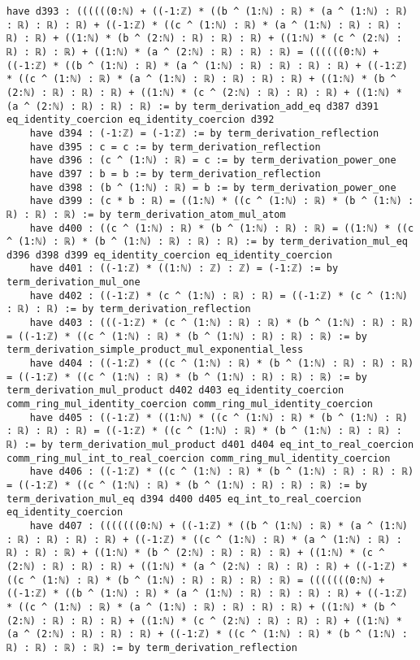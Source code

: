 \documentclass{article}
\begin{document}
\begin{tcolorbox}[colback=white!10, width=\linewidth]
\begin{lstlisting}[language=Lean4]
    have d393 : ((((((0:ℕ) + ((-1:ℤ) * ((b ^ (1:ℕ) : ℝ) * (a ^ (1:ℕ) : ℝ) : ℝ) : ℝ) : ℝ) + ((-1:ℤ) * ((c ^ (1:ℕ) : ℝ) * (a ^ (1:ℕ) : ℝ) : ℝ) : ℝ) : ℝ) + ((1:ℕ) * (b ^ (2:ℕ) : ℝ) : ℝ) : ℝ) + ((1:ℕ) * (c ^ (2:ℕ) : ℝ) : ℝ) : ℝ) + ((1:ℕ) * (a ^ (2:ℕ) : ℝ) : ℝ) : ℝ) = ((((((0:ℕ) + ((-1:ℤ) * ((b ^ (1:ℕ) : ℝ) * (a ^ (1:ℕ) : ℝ) : ℝ) : ℝ) : ℝ) + ((-1:ℤ) * ((c ^ (1:ℕ) : ℝ) * (a ^ (1:ℕ) : ℝ) : ℝ) : ℝ) : ℝ) + ((1:ℕ) * (b ^ (2:ℕ) : ℝ) : ℝ) : ℝ) + ((1:ℕ) * (c ^ (2:ℕ) : ℝ) : ℝ) : ℝ) + ((1:ℕ) * (a ^ (2:ℕ) : ℝ) : ℝ) : ℝ) := by term_derivation_add_eq d387 d391 eq_identity_coercion eq_identity_coercion d392
    have d394 : (-1:ℤ) = (-1:ℤ) := by term_derivation_reflection
    have d395 : c = c := by term_derivation_reflection
    have d396 : (c ^ (1:ℕ) : ℝ) = c := by term_derivation_power_one
    have d397 : b = b := by term_derivation_reflection
    have d398 : (b ^ (1:ℕ) : ℝ) = b := by term_derivation_power_one
    have d399 : (c * b : ℝ) = ((1:ℕ) * ((c ^ (1:ℕ) : ℝ) * (b ^ (1:ℕ) : ℝ) : ℝ) : ℝ) := by term_derivation_atom_mul_atom
    have d400 : ((c ^ (1:ℕ) : ℝ) * (b ^ (1:ℕ) : ℝ) : ℝ) = ((1:ℕ) * ((c ^ (1:ℕ) : ℝ) * (b ^ (1:ℕ) : ℝ) : ℝ) : ℝ) := by term_derivation_mul_eq d396 d398 d399 eq_identity_coercion eq_identity_coercion
    have d401 : ((-1:ℤ) * ((1:ℕ) : ℤ) : ℤ) = (-1:ℤ) := by term_derivation_mul_one
    have d402 : ((-1:ℤ) * (c ^ (1:ℕ) : ℝ) : ℝ) = ((-1:ℤ) * (c ^ (1:ℕ) : ℝ) : ℝ) := by term_derivation_reflection
    have d403 : (((-1:ℤ) * (c ^ (1:ℕ) : ℝ) : ℝ) * (b ^ (1:ℕ) : ℝ) : ℝ) = ((-1:ℤ) * ((c ^ (1:ℕ) : ℝ) * (b ^ (1:ℕ) : ℝ) : ℝ) : ℝ) := by term_derivation_simple_product_mul_exponential_less
    have d404 : ((-1:ℤ) * ((c ^ (1:ℕ) : ℝ) * (b ^ (1:ℕ) : ℝ) : ℝ) : ℝ) = ((-1:ℤ) * ((c ^ (1:ℕ) : ℝ) * (b ^ (1:ℕ) : ℝ) : ℝ) : ℝ) := by term_derivation_mul_product d402 d403 eq_identity_coercion comm_ring_mul_identity_coercion comm_ring_mul_identity_coercion
    have d405 : ((-1:ℤ) * ((1:ℕ) * ((c ^ (1:ℕ) : ℝ) * (b ^ (1:ℕ) : ℝ) : ℝ) : ℝ) : ℝ) = ((-1:ℤ) * ((c ^ (1:ℕ) : ℝ) * (b ^ (1:ℕ) : ℝ) : ℝ) : ℝ) := by term_derivation_mul_product d401 d404 eq_int_to_real_coercion comm_ring_mul_int_to_real_coercion comm_ring_mul_identity_coercion
    have d406 : ((-1:ℤ) * ((c ^ (1:ℕ) : ℝ) * (b ^ (1:ℕ) : ℝ) : ℝ) : ℝ) = ((-1:ℤ) * ((c ^ (1:ℕ) : ℝ) * (b ^ (1:ℕ) : ℝ) : ℝ) : ℝ) := by term_derivation_mul_eq d394 d400 d405 eq_int_to_real_coercion eq_identity_coercion
    have d407 : (((((((0:ℕ) + ((-1:ℤ) * ((b ^ (1:ℕ) : ℝ) * (a ^ (1:ℕ) : ℝ) : ℝ) : ℝ) : ℝ) + ((-1:ℤ) * ((c ^ (1:ℕ) : ℝ) * (a ^ (1:ℕ) : ℝ) : ℝ) : ℝ) : ℝ) + ((1:ℕ) * (b ^ (2:ℕ) : ℝ) : ℝ) : ℝ) + ((1:ℕ) * (c ^ (2:ℕ) : ℝ) : ℝ) : ℝ) + ((1:ℕ) * (a ^ (2:ℕ) : ℝ) : ℝ) : ℝ) + ((-1:ℤ) * ((c ^ (1:ℕ) : ℝ) * (b ^ (1:ℕ) : ℝ) : ℝ) : ℝ) : ℝ) = (((((((0:ℕ) + ((-1:ℤ) * ((b ^ (1:ℕ) : ℝ) * (a ^ (1:ℕ) : ℝ) : ℝ) : ℝ) : ℝ) + ((-1:ℤ) * ((c ^ (1:ℕ) : ℝ) * (a ^ (1:ℕ) : ℝ) : ℝ) : ℝ) : ℝ) + ((1:ℕ) * (b ^ (2:ℕ) : ℝ) : ℝ) : ℝ) + ((1:ℕ) * (c ^ (2:ℕ) : ℝ) : ℝ) : ℝ) + ((1:ℕ) * (a ^ (2:ℕ) : ℝ) : ℝ) : ℝ) + ((-1:ℤ) * ((c ^ (1:ℕ) : ℝ) * (b ^ (1:ℕ) : ℝ) : ℝ) : ℝ) : ℝ) := by term_derivation_reflection

\end{lstlisting}
\end{tcolorbox}
\end{document}
